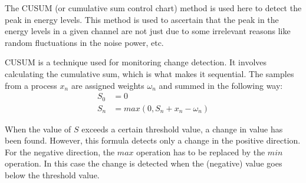 The CUSUM (or cumulative sum control chart) method is used here to detect 
the peak in energy levels. This method is used to ascertain that the peak in 
the energy levels in a given channel are not just due to some irrelevant 
reasons like random fluctuations in the noise power, etc.

CUSUM is a technique used for monitoring change detection. It involves 
calculating the cumulative sum, which is what makes it sequential. The samples
from a process $x_n$ are assigned weights $\omega_n$ and summed in the 
following way:
\begin{align}
    S_0 &= 0 \nonumber \\
    S_n &= max(0, S_n + x_n - \omega_n) \nonumber
\end{align}

When the value of $S$ exceeds a certain threshold value, a change in value has 
been found. However, this formula detects only a change in the positive 
direction. For the negative direction, the $max$ operation has to be replaced 
by the $min$ operation. In this case the change is detected when the 
(negative) value goes below the threshold value.





